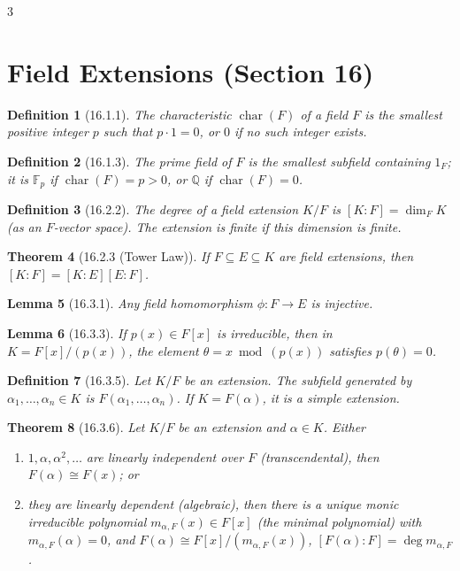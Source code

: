 \documentclass[10pt,landscape]{article}
\newtheorem{theorem}{Theorem}[section]
\newtheorem{definition}[theorem]{Definition}
\newtheorem{lemma}[theorem]{Lemma}
\begin{document}
\begin{multicols}{3}
\section{Field Extensions (Section 16)}

\begin{definition}[16.1.1]
The characteristic $\operatorname{char}(F)$ of a field $F$ is the smallest positive integer $p$ such that $p\cdot1=0$, or $0$ if no such integer exists.
\end{definition}

\begin{definition}[16.1.3]
The prime field of $F$ is the smallest subfield containing $1_F$; it is $\mathbb{F}_p$ if $\operatorname{char}(F)=p>0$, or $\mathbb{Q}$ if $\operatorname{char}(F)=0$.
\end{definition}

\begin{definition}[16.2.2]
The degree of a field extension $K/F$ is $[K:F]=\dim_F K$ (as an $F$-vector space). The extension is finite if this dimension is finite.
\end{definition}

\begin{theorem}[16.2.3 (Tower Law)]
If $F\subseteq E\subseteq K$ are field extensions, then $[K:F]=[K:E][E:F]$.
\end{theorem}

\begin{lemma}[16.3.1]
Any field homomorphism $\phi:F\to E$ is injective.
\end{lemma}

\begin{lemma}[16.3.3]
If $p(x)\in F[x]$ is irreducible, then in $K=F[x]/(p(x))$, the element $\theta = x\bmod (p(x))$ satisfies $p(\theta)=0$.
\end{lemma}

\begin{definition}[16.3.5]
Let $K/F$ be an extension. The subfield generated by $\alpha_1,\dots,\alpha_n\in K$ is $F(\alpha_1,\dots,\alpha_n)$. If $K=F(\alpha)$, it is a simple extension.
\end{definition}

\begin{theorem}[16.3.6]
Let $K/F$ be an extension and $\alpha\in K$. Either
\begin{enumerate}
\item $1,\alpha,\alpha^2,\dots$ are linearly independent over $F$ (transcendental), then $F(\alpha)\cong F(x)$; or
\item they are linearly dependent (algebraic), then there is a unique monic irreducible polynomial $m_{\alpha,F}(x)\in F[x]$ (the minimal polynomial) with $m_{\alpha,F}(\alpha)=0$, and $F(\alpha)\cong F[x]/(m_{\alpha,F}(x))$, $[F(\alpha):F]=\deg m_{\alpha,F}$.
\end{enumerate}
\end{theorem}


\end{multicols}
\end{document}
